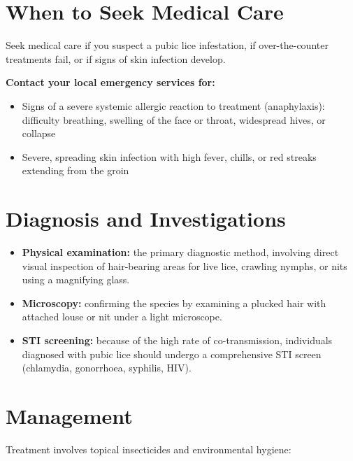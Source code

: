 \section*{When to Seek Medical Care}
Seek medical care if you suspect a pubic lice infestation, if over-the-counter treatments fail, or if signs of skin infection develop.

\textbf{Contact your local emergency services for:}
\begin{itemize}
    \item Signs of a severe systemic allergic reaction to treatment (anaphylaxis): difficulty breathing, swelling of the face or throat, widespread hives, or collapse
    \item Severe, spreading skin infection with high fever, chills, or red streaks extending from the groin
\end{itemize}

\section*{Diagnosis and Investigations}
\begin{itemize}
    \item \textbf{Physical examination:} the primary diagnostic method, involving direct visual inspection of hair-bearing areas for live lice, crawling nymphs, or nits using a magnifying glass.
    \item \textbf{Microscopy:} confirming the species by examining a plucked hair with attached louse or nit under a light microscope.
    \item \textbf{STI screening:} because of the high rate of co-transmission, individuals diagnosed with pubic lice should undergo a comprehensive STI screen (chlamydia, gonorrhoea, syphilis, HIV).
\end{itemize}

\section*{Management}
Treatment involves topical insecticides and environmental hygiene:

